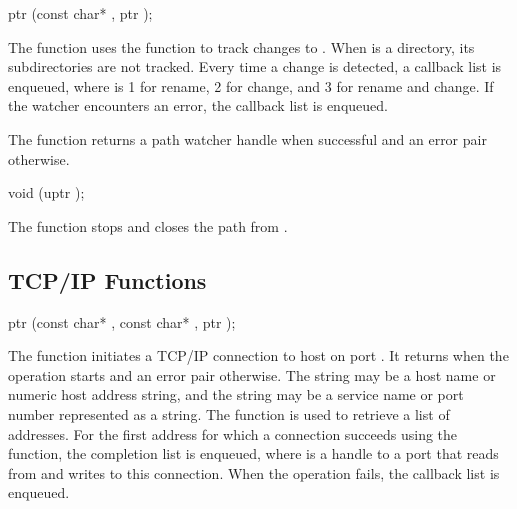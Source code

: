 \begin{function}
  ptr (const char* , ptr );
\end{function}

The  function uses the
 function to track changes to
. When  is a directory, its subdirectories are not
tracked. Every time a change is detected, a callback list
 is enqueued, where
 is 1 for rename, 2 for change, and 3 for rename and
change.  If the watcher encounters an error, the callback list
 is enqueued.

The  function returns a path watcher handle
when successful and an error pair otherwise.

\begin{function}
  void (uptr );
\end{function}

The  function stops and closes the
path  from .

\subsection {TCP/IP Functions}

\begin{function}
  ptr (const char* , const char* , ptr );
\end{function}

The  function initiates a TCP/IP connection to
host  on port . It returns  when the
operation starts and an error pair otherwise. The  string
may be a host name or numeric host address string, and the
 string may be a service name or port number represented
as a string. The  function is used to retrieve a
list of addresses. For the first address for which a connection
succeeds using the  function, the completion
list  is enqueued, where 
is a handle to a port that reads from and writes to this
connection. When the operation fails, the callback list
 is enqueued.

